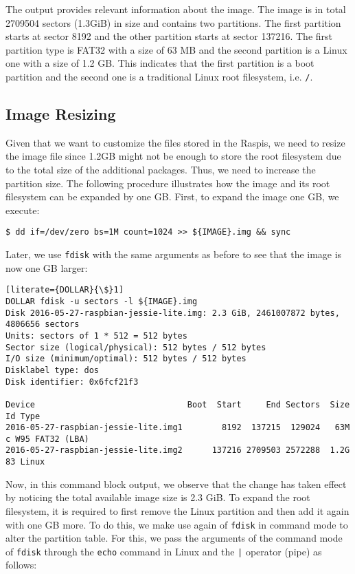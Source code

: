 The output provides relevant information about the image. The image is in
total 2709504 sectors (1.3GiB) in size and contains two partitions. The
first partition starts at sector 8192 and the other partition starts at
sector 137216. The first partition type is FAT32 with a size of 63 MB
and the second partition is a Linux one with a size of 1.2 GB. This
indicates that the first partition is a boot partition and the second
one is a traditional Linux root filesystem, i.e. \texttt{/}.

\subsection{Image Resizing}
Given that we want to customize the files stored in the \ac{Raspi}s,
we need to resize the image file since 1.2GB might not be enough to store
the root filesystem due to the total size of the additional packages. Thus,
we need to increase the partition size. The following procedure illustrates
how the image and its root filesystem can be expanded by one \ac{GB}.
First, to expand the image one \ac{GB}, we execute:

\begin{lstlisting}[]
$ dd if=/dev/zero bs=1M count=1024 >> ${IMAGE}.img && sync
\end{lstlisting}
\FloatBarrier
\vspace{-5mm}

Later, we use \texttt{fdisk} with the same arguments as before to see that
the image is now one \ac{GB} larger:
\begin{lstlisting}[literate={DOLLAR}{\$}1]
DOLLAR fdisk -u sectors -l ${IMAGE}.img
Disk 2016-05-27-raspbian-jessie-lite.img: 2.3 GiB, 2461007872 bytes, 4806656 sectors
Units: sectors of 1 * 512 = 512 bytes
Sector size (logical/physical): 512 bytes / 512 bytes
I/O size (minimum/optimal): 512 bytes / 512 bytes
Disklabel type: dos
Disk identifier: 0x6fcf21f3

Device                               Boot  Start     End Sectors  Size Id Type
2016-05-27-raspbian-jessie-lite.img1        8192  137215  129024   63M  c W95 FAT32 (LBA)
2016-05-27-raspbian-jessie-lite.img2      137216 2709503 2572288  1.2G 83 Linux
\end{lstlisting}
\FloatBarrier
\vspace{-5mm}

Now, in this command block output, we observe that the change has taken
effect by noticing the total available image size is 2.3 GiB. To expand the
root filesystem, it is required to first remove the Linux partition
and then add it again with one \ac{GB} more. To do this, we make use
again of \texttt{fdisk} in command mode to alter the partition table.
For this, we pass the arguments of the command mode of \texttt{fdisk}
through the \texttt{echo} command in Linux and the \texttt{|} operator
(pipe) as follows:

